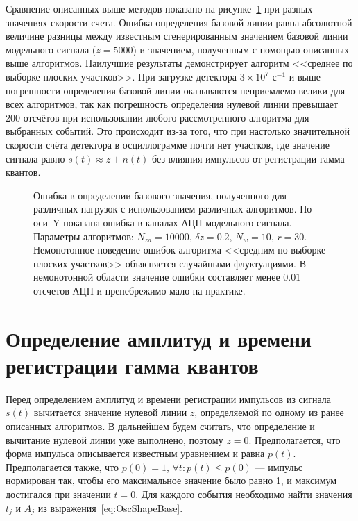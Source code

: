 Сравнение описанных выше методов показано на рисунке~\ref{fig:baselineMethodsComparison} при разных значениях скорости счета. Ошибка определения базовой линии равна абсолютной величине разницы между известным сгенерированным значением базовой линии модельного сигнала ($z = 5000$) и значением, полученным с помощью описанных выше алгоритмов. Наилучшие результаты демонстрирует алгоритм <<среднее по выборке плоских участков>>. При загрузке детектора $3 \times 10^7$ с${}^{-1}$ и выше погрешности определения базовой линии оказываются неприемлемо велики для всех алгоритмов, так как погрешность определения нулевой линии превышает 200 отсчётов при использовании любого рассмотренного алгоритма для выбранных событий. Это происходит из-за того, что при настолько значительной скорости счёта детектора в осциллограмме почти нет участков, где значение сигнала равно $s(t) \approx z + n(t)$ без влияния импульсов от регистрации гамма квантов.

\begin{figure}[ht!]
  \caption{ Ошибка в определении базового значения, полученного для различных нагрузок с использованием различных алгоритмов. По оси~Y показана ошибка в каналах АЦП модельного сигнала. Параметры алгоритмов: $N_{zd} = 10000$, $\delta z = 0.2$, $N_w = 10$, $r = 30$.  Немонотонное поведение ошибок алгоритма <<средним по выборке плоских участков>> объясняется случайными флуктуациями. В немонотонной области значение ошибки составляет менее $0.01$ отсчетов АЦП и пренебрежимо мало на практике.~\cite{Khilkevitch2020}}
  \label{fig:baselineMethodsComparison}
\end{figure}

\FloatBarrier


\section{Определение амплитуд и времени регистрации гамма квантов}

Перед определением амплитуд и времени регистрации импульсов из сигнала $s(t)$ вычитается значение нулевой линии $z$, определяемой по одному из ранее описанных алгоритмов. В дальнейшем будем считать, что определение и вычитание нулевой линии уже выполнено, поэтому $z = 0$. Предполагается, что форма импульса описывается известным уравнением и равна $p(t)$. Предполагается также, что $p(0) = 1$, $\forall t: p(t) \le p(0)$ --- импульс нормирован так, чтобы его максимальное значение было равно 1, и максимум достигался при значении $t = 0$. Для каждого события необходимо найти значения $t_j$ и $A_j$ из выражения~\ref{eq:OscShapeBase}.~\cite{Khilkevitch2020}

